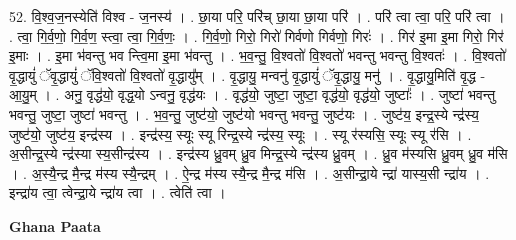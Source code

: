 \documentclass[17pt]{extarticle}
\begin{document}
52. वि॒श्व॒ज॒नस्येति॑ विश्व - ज॒नस्य॑ । . छा॒या परि॒ परि॑च् छा॒या छा॒या परि॑ । . परि॑ त्वा त्वा॒ परि॒ परि॑ त्वा । . त्वा॒ गि॒र्व॒णो॒ गि॒र्व॒ण॒ स्त्वा॒ त्वा॒ गि॒र्व॒णः॒ । . गि॒र्व॒णो॒ गिरो॒ गिरो॑ गिर्वणो गिर्वणो॒ गिरः॑ । . गिर॑ इ॒मा इ॒मा गिरो॒ गिर॑ इ॒माः । . इ॒मा भ॑वन्तु भव न्त्वि॒मा इ॒मा भ॑वन्तु । . भ॒व॒न्तु॒ वि॒श्वतो॑ वि॒श्वतो॑ भवन्तु भवन्तु वि॒श्वतः॑ । . वि॒श्वतो॑ वृ॒द्धायुं॑ ॅवृ॒द्धायुं॑ ॅवि॒श्वतो॑ वि॒श्वतो॑ वृ॒द्धायु᳚म् । . वृ॒द्धायु॒ मन्वनु॑ वृ॒द्धायुं॑ ॅवृ॒द्धायु॒ मनु॑ । . वृ॒द्धायु॒मिति॑ वृ॒द्ध - आ॒यु॒म् । . अनु॒ वृद्ध॑यो॒ वृद्ध॒यो ऽन्वनु॒ वृद्ध॑यः । . वृद्ध॑यो॒ जुष्टा॒ जुष्टा॒ वृद्ध॑यो॒ वृद्ध॑यो॒ जुष्टाः᳚ । . जुष्टा॑ भवन्तु भवन्तु॒ जुष्टा॒ जुष्टा॑ भवन्तु । . भ॒व॒न्तु॒ जुष्ट॑यो॒ जुष्ट॑यो भवन्तु भवन्तु॒ जुष्ट॑यः । . जुष्ट॑य॒ इन्द्र॒स्ये न्द्र॑स्य॒ जुष्ट॑यो॒ जुष्ट॑य॒ इन्द्र॑स्य । . इन्द्र॑स्य॒ स्यूः स्यू रिन्द्र॒स्ये न्द्र॑स्य॒ स्यूः । . स्यू र॑स्यसि॒ स्यूः स्यू र॑सि । . अ॒सीन्द्र॒स्ये न्द्र॑स्या स्य॒सीन्द्र॑स्य । . इन्द्र॑स्य ध्रु॒वम् ध्रु॒व मिन्द्र॒स्ये न्द्र॑स्य ध्रु॒वम् । . ध्रु॒व म॑स्यसि ध्रु॒वम् ध्रु॒व म॑सि । . अ॒स्यै॒न्द्र मै॒न्द्र म॑स्य स्यै॒न्द्रम् । . ऐ॒न्द्र म॑स्य स्यै॒न्द्र मै॒न्द्र म॑सि । . अ॒सीन्द्रा॒ये न्द्रा॑ यास्य॒सी न्द्रा॑य । . इन्द्रा॑य त्वा॒ त्वेन्द्रा॒ये न्द्रा॑य त्वा । . त्वेति॑ त्वा । \newline

\textbf{Ghana Paata } \newline
\end{document}
